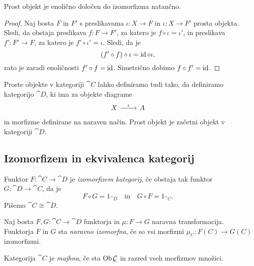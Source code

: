 \begin{trditev}
Prost objekt je enolično določen do izomorfizma natančno.
\end{trditev}

\begin{proof}
Naj bosta $F$ in $F'$ s preslikavama $\iota \colon X \to F$ in
$\iota \colon X \to F'$ prosta objekta. Sledi, da obstaja
preslikava $f \colon F \to F'$, za katero je
$f \circ \iota = \iota'$, in preslikava $f' \colon F' \to F$, za
katero je $f' \circ \iota' = \iota$. Sledi, da je
\[
(f' \circ f) \circ \iota = \operatorname{id} \circ \iota,
\]
zato je zaradi enoličnosti $f' \circ f = \operatorname{id}$. Simetrično dobimo
$f \circ f' = \operatorname{id}$.
\end{proof}

\begin{opomba}
Proste objekte v kategoriji $\cat{C}$ lahko definiramo tudi tako,
da definiramo kategorijo $\cat{D}$, ki ima za objekte diagrame
\[
\begin{tikzcd}
X \arrow[r, "\iota"] & A
\end{tikzcd}
\]
in morfizme definirane na naraven način. Prost objekt je začetni
objekt v kategoriji $\cat{D}$.
\end{opomba}

\newpage

\subsection{Izomorfizem in ekvivalenca kategorij}


\begin{definicija}
Funktor $F \colon \cat{C} \to \cat{D}$ je
\emph{izomorfizem kategorij}, če
obstaja tak funktor $G \colon \cat{D} \to \cat{C}$, da je
\[
F \circ G = 1_{\cat{D}}
\quad \text{in} \quad
G \circ F = 1_{\cat{C}}.
\]
Pišemo $\cat{C} \cong \cat{D}$.
\end{definicija}

\begin{definicija}
Naj bosta $F, G \colon \cat{C} \to \cat{D}$ funktorja in
$\mu \colon F \to G$ naravna transformacija. Funktorja $F$ in $G$
sta
\emph{naravno izomorfna}, če so
vsi morfizmi $\mu_C \colon F(C) \to G(C)$ izomorfizmi.
\end{definicija}

\begin{definicija}
Kategorija $\cat{C}$ je \emph{majhna}, če
sta $\operatorname{Ob} \underline{\mathcal{C}}$ in razred vseh morfizmov množici.
\end{definicija}

